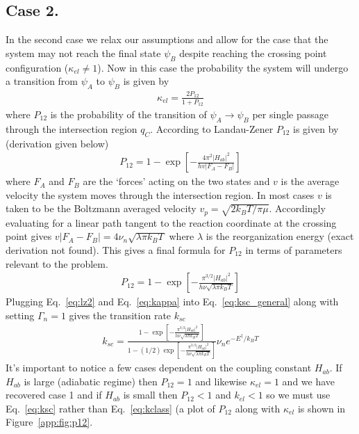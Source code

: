 \subsection{Case 2.}

In the second case we relax our assumptions and allow for the case that the system may not reach the final state $\psi_B$ despite reaching the crossing point configuration ($\kappa_{el} \neq 1$). Now in this case the probability the system will undergo a transition from $\psi_A$ to $\psi_B$ is given by
\begin{align}
    \kappa_{el} = \frac{2P_{12}}{1+P_{12}}
    \label{eq:kappa}
\end{align}
where $P_{12}$ is the probability of the transition of $\psi_A \rightarrow \psi_B$ per single passage through the intersection region $q_C$.  According to Landau-Zener $P_{12}$ is given by (derivation given below)
\begin{align}
    P_{12} = 1 - \exp \left[ - \frac{4\pi^2|H_{ab}|^2}{hv |F_A - F_B|} \right]
    \label{eq:lz1}
\end{align}
where $F_A$ and $F_B$ are the `forces' acting on the two states and $v$ is the average velocity the system moves through the intersection region. In most cases $v$ is taken to be the Boltzmann averaged velocity $v_p=\sqrt{2k_B T/\pi \mu}$. Accordingly evaluating for a linear path tangent to the reaction coordinate at the crossing point gives $v|F_A-F_B| = 4\nu_n \sqrt{\lambda\pi k_B T}$ where $\lambda$ is the reorganization energy (exact derivation not found). This gives a final formula for $P_{12}$ in terms of parameters relevant to the problem.
\begin{align}
    P_{12} = 1 - \exp \left[ - \frac{\pi^{3/2}|H_{ab}|^2}{h\nu \sqrt{\lambda\pi k_B T}} \right]
    \label{eq:lz2}
\end{align}
Plugging Eq.~\ref{eq:lz2} and Eq.~\ref{eq:kappa} into Eq.~\ref{eq:ksc_general} along with setting $\Gamma_n = 1$ gives the transition rate $k_{sc}$
\begin{align}
    k_{sc} = \frac{1 - \exp \left[ - \frac{\pi^{3/2}|H_{ab}|^2}{h\nu \sqrt{\lambda\pi k_B T}} \right]}{1 - (1/2) \exp \left[ - \frac{\pi^{3/2}|H_{ab}|^2}{h\nu \sqrt{\lambda\pi k_B T}} \right]} \nu_n e^{-E^\ddagger / k_B T}
    \label{eq:ksc}
\end{align}
It's important to notice a few cases dependent on the coupling constant $H_{ab}$. If $H_{ab}$ is large (adiabatic regime) then $P_{12} = 1$ and likewise $\kappa_{el} = 1$ and we have recovered case 1 and if $H_{ab}$ is small then $P_{12} < 1$ and $k_{el} < 1$ so we must use Eq.~\ref{eq:ksc} rather than Eq.~\ref{eq:kclass} (a plot of $P_{12}$ along with $\kappa_{el}$ is shown in Figure~\ref{app:fig:p12}.

